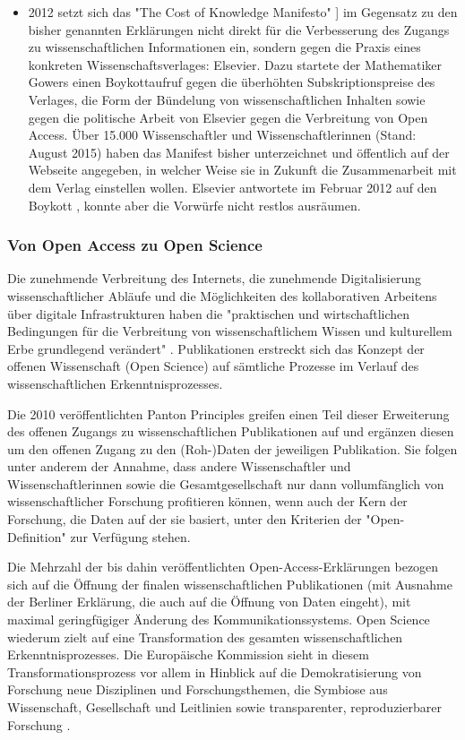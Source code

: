 \begin{itemize}
\item 2012 setzt sich das "The Cost of Knowledge Manifesto" \cite{Gowers_2012} ] im Gegensatz zu den bisher genannten Erklärungen nicht direkt für die Verbesserung des Zugangs zu wissenschaftlichen Informationen ein, sondern gegen die Praxis eines konkreten Wissenschaftsverlages: Elsevier. Dazu startete der Mathematiker Gowers einen Boykottaufruf gegen die überhöhten Subskriptionspreise des Verlages, die Form der Bündelung von wissenschaftlichen Inhalten sowie gegen die politische Arbeit von Elsevier gegen die Verbreitung von Open Access. Über 15.000 Wissenschaftler und Wissenschaftlerinnen (Stand: August 2015) haben das Manifest bisher unterzeichnet und öffentlich auf der Webseite angegeben, in welcher Weise sie in Zukunft die Zusammenarbeit mit dem Verlag einstellen wollen. Elsevier antwortete im Februar 2012 auf den Boykott \cite{elsevier_2012}, konnte aber die Vorwürfe nicht restlos ausräumen.
\end{itemize}

\subsubsection{Von Open Access zu Open Science}

Die zunehmende Verbreitung des Internets, die zunehmende Digitalisierung wissenschaftlicher Abläufe und die Möglichkeiten des kollaborativen Arbeitens über digitale Infrastrukturen haben die "praktischen und wirtschaftlichen Bedingungen für die Verbreitung von wissenschaftlichem Wissen und kulturellem Erbe grundlegend verändert" \cite{berliner_erklaerung_2003}. Publikationen erstreckt sich das Konzept der offenen Wissenschaft (Open Science) auf sämtliche Prozesse im Verlauf des wissenschaftlichen Erkenntnisprozesses.

Die 2010 veröffentlichten Panton Principles \cite{Mounce_2015} greifen einen Teil dieser Erweiterung des offenen Zugangs zu wissenschaftlichen Publikationen auf und ergänzen diesen um den offenen Zugang zu den (Roh-)Daten der jeweiligen Publikation. Sie folgen unter anderem der Annahme, dass andere Wissenschaftler und Wissenschaftlerinnen sowie die Gesamtgesellschaft nur dann vollumfänglich von wissenschaftlicher Forschung profitieren können, wenn auch der Kern der Forschung, die Daten auf der sie basiert, unter den Kriterien der "Open-Definition" \cite{open_definition} zur Verfügung stehen.

Die Mehrzahl der bis dahin veröffentlichten Open-Access-Erklärungen bezogen sich auf die Öffnung der finalen wissenschaftlichen Publikationen (mit Ausnahme der Berliner Erklärung, die auch auf die Öffnung von Daten eingeht), mit maximal geringfügiger Änderung des Kommunikationssystems. Open Science wiederum zielt auf eine Transformation des gesamten wissenschaftlichen Erkenntnisprozesses. Die Europäische Kommission sieht in diesem Transformationsprozess vor allem in Hinblick auf die Demokratisierung von Forschung neue Disziplinen und Forschungsthemen, die Symbiose aus Wissenschaft, Gesellschaft und Leitlinien sowie transparenter, reproduzierbarer Forschung \cite{eu_agenda_open_science_2015}.

